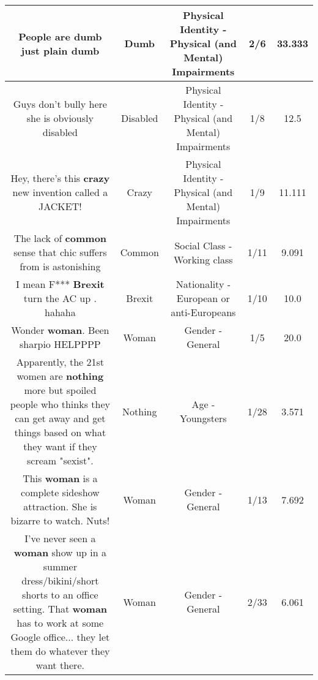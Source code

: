 \documentclass[11pt]{article}
\newlength\mylength
\begin{document}
\begin{center}
\begin{longtable}{|C{.65\mylength}|C{.30\mylength}|C{.12\mylength}|C{.12\mylength}|C{.12\mylength}|}
  \small People are \textbf{dumb} just plain dumb\normalsize   & Dumb & Physical Identity - Physical (and Mental) Impairments & 2/6 & 33.333 \\  \hline
  \small Guys don't bully here she is obviously disabled\normalsize   & Disabled & Physical Identity - Physical (and Mental) Impairments & 1/8 & 12.5 \\  \hline
  \small Hey, there's this \textbf{crazy} new invention called a JACKET!\normalsize   & Crazy & Physical Identity - Physical (and Mental) Impairments & 1/9 & 11.111 \\  \hline
  \small The lack of \textbf{common} sense that chic suffers from is astonishing\normalsize   & Common & Social Class - Working class & 1/11 & 9.091 \\  \hline
  \small I mean F*** \textbf{Brexit} turn the AC up . hahaha\normalsize   & Brexit & Nationality - European or anti-Europeans & 1/10 & 10.0 \\  \hline
  \small Wonder \textbf{woman}. Been sharpio HELPPPP\normalsize   & Woman & Gender - General & 1/5 & 20.0 \\  \hline
  \small Apparently, the 21st women are \textbf{nothing} more but spoiled people who thinks they can get away and get things based on what they want if they scream "sexist".\normalsize   & Nothing & Age - Youngsters & 1/28 & 3.571 \\  \hline
  \small This \textbf{woman} is a complete sideshow attraction. She is bizarre to watch. Nuts!\normalsize   & Woman & Gender - General & 1/13 & 7.692 \\  \hline
  \small I've never seen a \textbf{woman} show up in a summer dress/bikini/short shorts to an office setting. That \textbf{woman} has to work at some Google office... they let them do whatever they want there.\normalsize   & Woman & Gender - General & 2/33 & 6.061 \\  \hline

\end{longtable}
\end{center}
\end{document}
